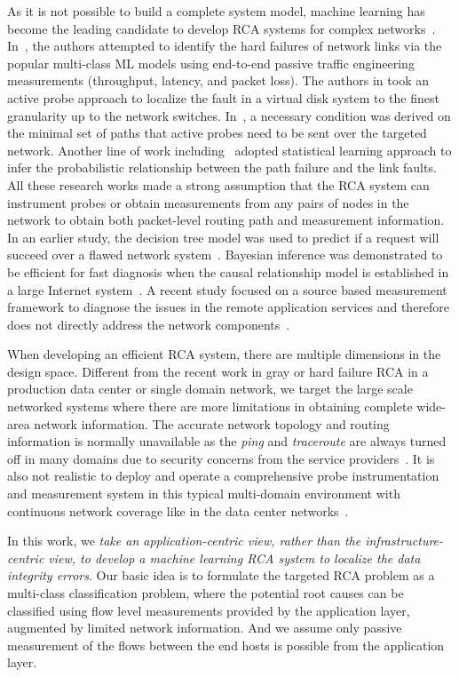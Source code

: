 As it is not possible to build a complete system model, machine learning has become the leading candidate to develop RCA systems for complex networks~\cite{Boutaba:2018aa}.  
In~\cite{Link-JIoT-2019}, the authors attempted to identify the hard failures of network links via the popular multi-class ML models using end-to-end 
passive traffic engineering measurements (throughput, latency, and packet loss). The authors in \cite{DeepView:NSDI18} took an active probe approach to localize the fault in a 
virtual disk system to the finest granularity up to the network switches. In~\cite{netbouncer:nsdi18}, a necessary condition was derived on the minimal set of paths 
that active probes need to be sent over the targeted network. Another line of work including~\cite{kdd14,detector:atc17,arzani2018democratically} adopted statistical 
learning approach to infer the probabilistic relationship between the path failure and the link faults. All these research works made a strong assumption that the RCA system 
can instrument probes or obtain measurements from any pairs of nodes in the network to obtain both packet-level routing path and measurement information. In an earlier study, 
the decision tree model was used to predict if a request will succeed over a flawed network system~\cite{DT:2004}. Bayesian inference was demonstrated to be efficient for fast 
diagnosis when the causal relationship model is established in a large Internet system~\cite{BN-Internet:2007}. A recent study focused on a source based measurement framework 
to diagnose the issues in the remote application services and therefore does not directly address the network components~\cite{microrca:noms2020}.

When developing an efficient RCA system, there are multiple dimensions in the design space. Different from the recent work in 
gray or hard failure RCA  in a production data center or single domain network, we target the large scale networked systems 
where there are more limitations in obtaining complete wide-area network information. The accurate network topology and 
routing information is normally unavailable as the {\it ping} and {\it traceroute} are always turned off in many domains due to security concerns 
from the service providers~\cite{topology_obf_20}. It is also not realistic to deploy and operate a comprehensive probe instrumentation 
and measurement system in this typical multi-domain environment with continuous network coverage like in the data center networks~\cite{guo2015pingmesh}. 

In this work, we \emph {take an application-centric view, rather than the infrastructure-centric view, to develop 
a machine learning RCA system to localize the data integrity errors}. Our basic idea is to formulate the targeted RCA problem as a multi-class classification problem, 
where the potential root causes can be classified using flow level measurements provided by the application layer, augmented by limited network information.
And we assume only passive measurement of the flows between the end hosts is possible from the application layer. 

